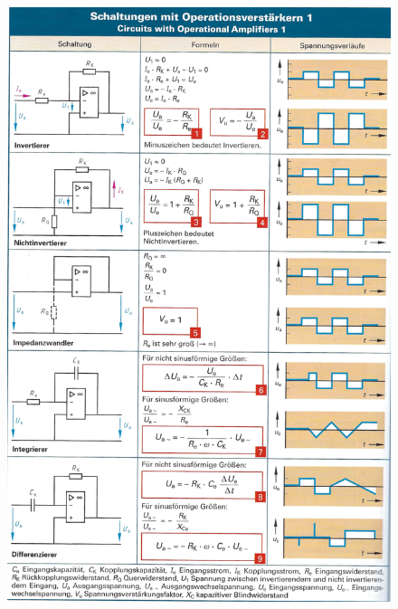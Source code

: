 \documentclass[a5paper, 12pt]{scrartcl}
\begin{document}
\begin{figure}[H]
  \centering
  \includegraphics[width=.93\textwidth]{OPV1}
\end{figure}
\end{document}
